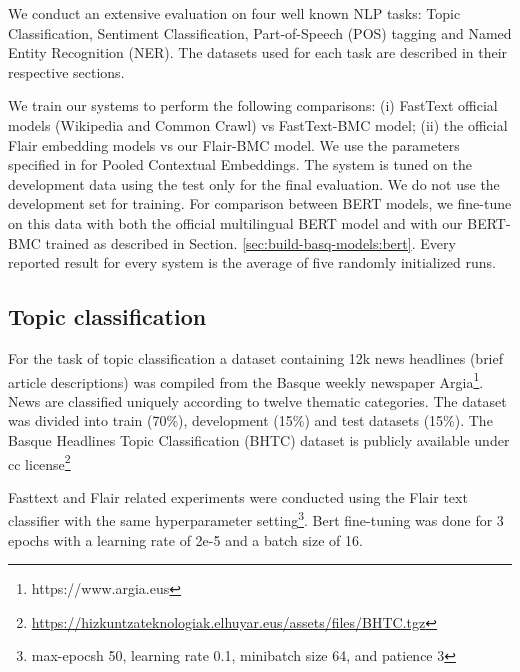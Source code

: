 \documentclass[10pt, a4paper]{article}
\begin{document}






We conduct an extensive evaluation on four well known NLP tasks: Topic Classification, Sentiment Classification, Part-of-Speech (POS) tagging and Named Entity Recognition (NER). The datasets used for each task are described in their respective sections.

We train our systems to perform the following comparisons: (i) FastText official models (Wikipedia and Common Crawl) vs FastText-BMC model; (ii) the official Flair embedding models vs our Flair-BMC model. We use the parameters specified in \cite{akbik2019naacl} for Pooled Contextual Embeddings. The system is tuned on the development data using the test only for the final evaluation. We do not use the development set for training. For comparison between BERT models, we fine-tune on this data with both the official multilingual BERT \cite{devlin2019bert} model and with our BERT-BMC trained as described in Section.  \ref{sec:build-basq-models:bert}. Every reported result for every system is the average of five randomly initialized runs.

\subsection{Topic classification}\label{sec:topic}

For the task of topic classification a dataset containing 12k news headlines (brief article descriptions) was compiled from the Basque weekly newspaper Argia\footnote{https://www.argia.eus}. News are classified uniquely according to twelve thematic categories. The dataset was divided into train (70\%), development (15\%) and test datasets (15\%). The Basque Headlines Topic Classification (BHTC) dataset is publicly available under cc license\footnote{\url{https://hizkuntzateknologiak.elhuyar.eus/assets/files/BHTC.tgz}} 

Fasttext and Flair related experiments were conducted using the Flair text classifier with the same hyperparameter setting\footnote{max-epocsh 50, learning rate 0.1, minibatch size 64, and  patience 3 }. Bert fine-tuning was done for 3 epochs with a learning rate of 2e-5 and a batch size of 16.
\end{document}
